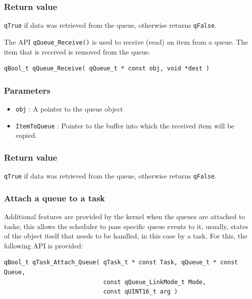 \documentclass{article}
\begin{document}
\subsubsection*{Return value}
\lstinline{qTrue} if data was retrieved from the queue, otherwise returns \lstinline{qFalse}.

\noindent\hrulefill  

The API \lstinline{qQueue_Receive()}  is used to receive (read) an item from a queue. The item that is received is removed from the queue. \\

\begin{lstlisting}[style=CStyle]
qBool_t qQueue_Receive( qQueue_t * const obj, void *dest )
\end{lstlisting}

\subsubsection*{Parameters}
\begin{itemize}
    \item \lstinline{obj} : A pointer to the queue object
    \item \lstinline{ItemToQueue} : Pointer to the buffer into which the received item will be copied.
\end{itemize}  

\subsubsection*{Return value}
\lstinline{qTrue} if data was retrieved from the queue, otherwise returns \lstinline{qFalse}.

\subsubsection{Attach a queue to a task}
Additional features are provided by the kernel when the queues are attached to tasks; this allows the scheduler to pass specific queue events to it, usually, states of the object itself that needs to be handled, in this case by a task. For this, the following API is provided:  \\
    
\begin{lstlisting}[style=CStyle]
qBool_t qTask_Attach_Queue( qTask_t * const Task, qQueue_t * const Queue,
                            const qQueue_LinkMode_t Mode, 
                            const qUINT16_t arg )
\end{lstlisting}
    
\end{document}
